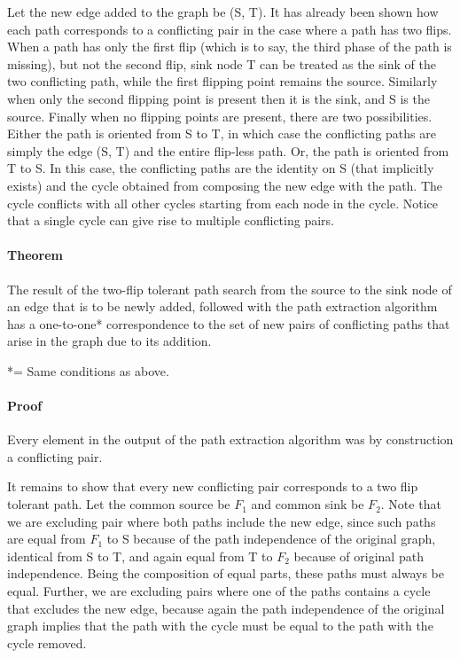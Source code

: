 \documentclass{article}
\begin{document}
Let the new edge added to the graph be (S, T).
It has already been shown how each path corresponds to a conflicting pair in the case where a path has two flips. When a path has only the first flip (which is to say, the third phase of the path is missing), but not the second flip, sink node T can be treated as the sink of the two conflicting path, while the first flipping point remains the source. Similarly when only the second flipping point is present then it is the sink, and S is the source. Finally when no flipping points are present, there are two possibilities. 
Either the path is oriented from S to T, in which case the conflicting paths are simply the edge (S, T) and the entire flip-less path.
Or, the path is oriented from T to S. In this case, the conflicting paths are the identity on S (that implicitly exists) and the cycle obtained from composing the new edge with the path. The cycle conflicts with all other cycles starting from each node in the cycle. Notice that a single cycle can give rise to multiple conflicting pairs.


\paragraph{Theorem} The result of the two-flip tolerant path search from the source to the sink node of an edge that is to be newly added, followed with the path extraction algorithm has a one-to-one* correspondence to the set of new pairs of conflicting paths that arise in the graph due to its addition.

*= Same conditions as above.

\paragraph{Proof}

Every element in the output of the path extraction algorithm was by construction a conflicting pair.

It remains to show that every new conflicting pair corresponds to a two flip tolerant path. Let the common source be $F_1$ and common sink be $F_2$. 
Note that we are excluding pair where both paths include the new edge, since such paths are equal from $F_1$ to S because of the path independence of the original graph, identical from S to T, and again equal from T to $F_2$ because of original path independence. Being the composition of equal parts, these paths must always be equal.
Further, we are excluding pairs where one of the paths contains a cycle that excludes the new edge, because again the path independence of the original graph implies that the path with the cycle must be equal to the path with the cycle removed.
\end{document}
